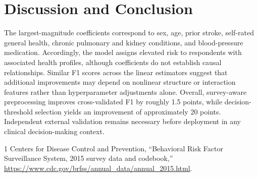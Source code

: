 \documentclass[10pt,conference]{IEEEtran}
\begin{document}
\section{Discussion and Conclusion}
The largest-magnitude coefficients correspond to sex, age, prior stroke,
self-rated general health, chronic pulmonary and kidney conditions, and
blood-pressure medication. Accordingly, the model assigns elevated risk
to respondents with associated health profiles, although coefficients
do not establish causal relationships. Similar F1 scores across the
linear estimators suggest that additional improvements may depend on
nonlinear structure or interaction features rather than hyperparameter
adjustments alone. Overall, survey-aware preprocessing improves
cross-validated F1 by roughly 1.5 points, while decision-threshold
selection yields an improvement of approximately 20 points.
Independent external validation remains necessary before deployment in
any clinical decision-making context.

\begin{thebibliography}{1}
Centers for Disease Control and Prevention, ``Behavioral Risk Factor
Surveillance System, 2015 survey data and codebook,''
\url{https://www.cdc.gov/brfss/annual_data/annual_2015.html}.
\end{thebibliography}
\end{document}
